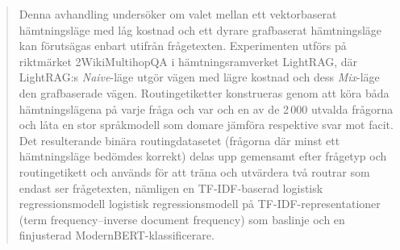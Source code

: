 \documentclass[english, bibtex]{kththesis}               %
\numberwithin{listing}{chapter}
\providecommand{\DIFaddtex}[1]{{\protect\color{blue} \sf #1}} %
\providecommand{\DIFdeltex}[1]{{\protect\color{red} \scriptsize #1}} %
\providecommand{\DIFaddbegin}{} %
\providecommand{\DIFaddend}{} %
\providecommand{\DIFdelbegin}{} %
\providecommand{\DIFdelend}{} %
\providecommand{\DIFadd}[1]{\texorpdfstring{\DIFaddtex{#1}}{#1}} %
\providecommand{\DIFdel}[1]{\texorpdfstring{\DIFdeltex{#1}}{}} %
\begin{document}
\begin{abstract}
\begin{scontents}[store-env=abstracts,print-env=true]
Denna avhandling undersöker om valet mellan ett vektorbaserat hämtningsläge med låg kostnad och ett dyrare grafbaserat hämtningsläge kan förutsägas enbart utifrån frågetexten. Experimenten utförs på riktmärket 2WikiMultihopQA i hämtningsramverket LightRAG, där LightRAG:s \emph{Naive}-läge utgör vägen med lägre kostnad och dess \emph{Mix}-läge den grafbaserade vägen. Routingetiketter konstrueras genom att köra båda hämtningslägena på \DIFdelbegin \DIFdel{varje fråga och }\DIFdelend \DIFaddbegin \DIFadd{var och en av de 2\,000 utvalda frågorna och }\DIFaddend låta en stor språkmodell som domare jämföra respektive svar mot facit. Det resulterande binära routingdatasetet \DIFaddbegin \DIFadd{(frågorna där minst ett hämtningsläge bedömdes korrekt) }\DIFaddend delas upp gemensamt efter frågetyp och routingetikett och används för att träna och utvärdera två routrar som endast ser frågetexten, nämligen en \DIFdelbegin \DIFdel{TF-IDF-baserad logistisk regressionsmodell }\DIFdelend \DIFaddbegin \DIFadd{logistisk regressionsmodell på TF-IDF-representationer (term frequency--inverse document frequency) }\DIFaddend som baslinje och en finjusterad ModernBERT-klassificerare.


\end{scontents}
\end{abstract}
\end{document}
